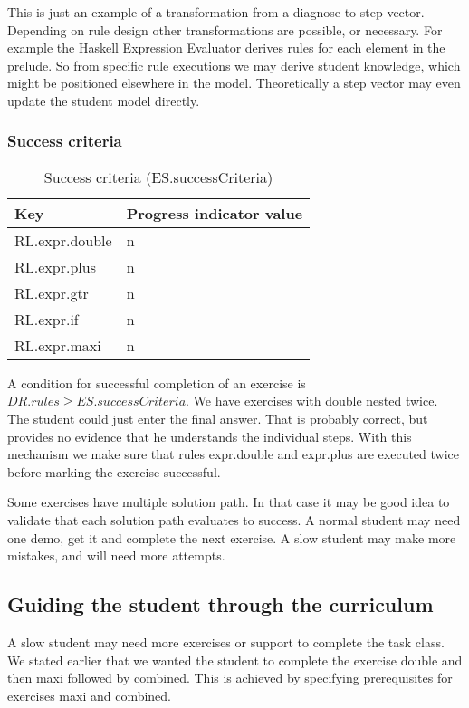 This is just an example of a transformation from a diagnose to step vector.
Depending on rule design other transformations are possible, or necessary.
For example the Haskell Expression Evaluator derives rules for each element in the prelude.
So from specific rule executions we may derive student knowledge, which might be positioned elsewhere in the model.
Theoretically a step vector may even update the student model directly.

\subsubsection{Success criteria}
\begin{table}[H]
\begin{tabular}{| l | l |}
\hline
Key & Progress indicator value\\
\hline
RL.expr.double& n\\
RL.expr.plus& n\\
RL.expr.gtr& n\\
RL.expr.if& n\\
RL.expr.maxi& n\\
\hline
\end{tabular}
\caption{Success criteria (ES.successCriteria)}
\label{double.success}
\end{table}

A condition for successful completion of an exercise is $\mathit{DR.rules \geq ES.successCriteria}$.
We have exercises with double nested twice. 
The student could just enter the final answer. 
That is probably correct, but provides no evidence that he understands the individual steps.
With this mechanism we make sure that rules expr.double and expr.plus are executed twice before marking the exercise successful.

Some exercises have multiple solution path. 
In that case it may be good idea to validate that each solution path evaluates to success.
A normal student may need one demo, get it and complete the next exercise.
A slow student may make more mistakes, and will need more attempts.




\subsection{Guiding the student through the curriculum}
A slow student may need more exercises or support to complete the task class.
We stated earlier that we wanted the student to complete the exercise double and then maxi followed by combined.
This is achieved by specifying prerequisites for exercises maxi and combined.

